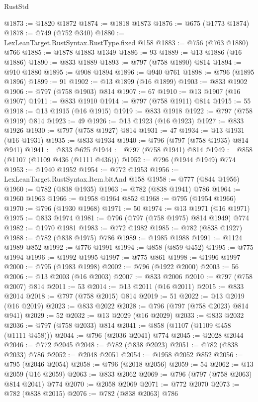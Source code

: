 \begin{lexlean}{RustStd}
\begin{coremodule}
{\begin{coremodule}
{{{{{{{{{{{{{{@1873 := @1820 @1872
@1874 := @1818 @1873
@1876 := @675 (@1773 @1874)
@1878 := @749 (@752 @340)
@1880 := LexLeanTarget.RustSyntax.RustType.fixed @158
@1883 := @756 (@763 @1880) @766
@1885 := @1878 @1883 @1349
@1886 := 93
@1889 := @13 @1886 (@16 @1886)
@1890 := @833 @1889
@1893 := @797 (@758 @1890) @814
@1894 := @910 @1880
@1895 := @908 @1894
@1896 := @940 @761
@1898 := @796 (@1895 @1896)
@1899 := 91
@1902 := @13 @1899 (@16 @1899)
@1903 := @833 @1902
@1906 := @797 (@758 @1903) @814
@1907 := 67
@1910 := @13 @1907 (@16 @1907)
@1911 := @833 @1910
@1914 := @797 (@758 @1911) @814
@1915 := 55
@1918 := @13 @1915 (@16 @1915)
@1919 := @833 @1918
@1922 := @797 (@758 @1919) @814
@1923 := 49
@1926 := @13 @1923 (@16 @1923)
@1927 := @833 @1926
@1930 := @797 (@758 @1927) @814
@1931 := 47
@1934 := @13 @1931 (@16 @1931)
@1935 := @833 @1934
@1940 := @796 (@797 (@758 @1935) @814 @941)
@1941 := @833 @625
@1944 := @797 (@758 @1941) @814
@1949 := @858 (@1107 (@1109 @436 (@1111 @436)))
@1952 := @796 (@1944 @1949) @774
@1953 := @1940 @1952
@1954 := @772 @1953
@1956 := LexLeanTarget.RustSyntax.Item.bitAnd @158
@1958 := @777 (@844 @1956)
@1960 := @782 (@838 @1935)
@1963 := @782 (@838 @1941) @786
@1964 := @1960 @1963
@1966 := @1958 @1964 @852
@1968 := @795 (@1954 @1966)
@1970 := @796 (@1930 @1968)
@1971 := 50
@1974 := @13 @1971 (@16 @1971)
@1975 := @833 @1974
@1981 := @796 (@797 (@758 @1975) @814 @1949) @774
@1982 := @1970 @1981
@1983 := @772 @1982
@1985 := @782 (@838 @1927)
@1988 := @782 (@838 @1975) @786
@1989 := @1985 @1988
@1991 := @1124 @1989 @852
@1992 := @776 @1991
@1994 := @858 (@859 @452)
@1995 := @775 @1994
@1996 := @1992 @1995
@1997 := @775 @861
@1998 := @1996 @1997
@2000 := @795 (@1983 @1998)
@2002 := @796 (@1922 @2000)
@2003 := 56
@2006 := @13 @2003 (@16 @2003)
@2007 := @833 @2006
@2010 := @797 (@758 @2007) @814
@2011 := 53
@2014 := @13 @2011 (@16 @2011)
@2015 := @833 @2014
@2018 := @797 (@758 @2015) @814
@2019 := 51
@2022 := @13 @2019 (@16 @2019)
@2023 := @833 @2022
@2028 := @796 (@797 (@758 @2023) @814 @941)
@2029 := 52
@2032 := @13 @2029 (@16 @2029)
@2033 := @833 @2032
@2036 := @797 (@758 @2033) @814
@2041 := @858 (@1107 (@1109 @458 (@1111 @458)))
@2044 := @796 (@2036 @2041) @774
@2045 := @2028 @2044
@2046 := @772 @2045
@2048 := @782 (@838 @2023)
@2051 := @782 (@838 @2033) @786
@2052 := @2048 @2051
@2054 := @1958 @2052 @852
@2056 := @795 (@2046 @2054)
@2058 := @796 (@2018 @2056)
@2059 := 54
@2062 := @13 @2059 (@16 @2059)
@2063 := @833 @2062
@2069 := @796 (@797 (@758 @2063) @814 @2041) @774
@2070 := @2058 @2069
@2071 := @772 @2070
@2073 := @782 (@838 @2015)
@2076 := @782 (@838 @2063) @786
}}}}}}}}}}}}}}
\end{coremodule}}
\end{coremodule}
\end{lexlean}
